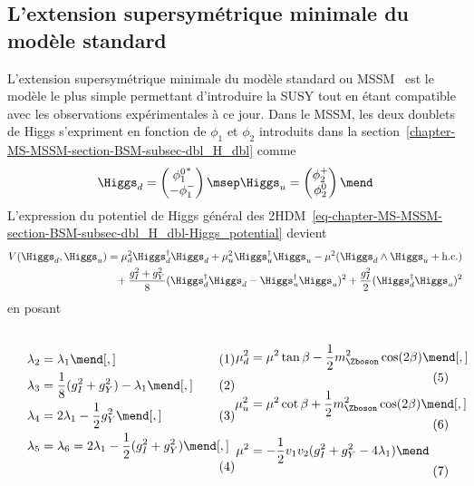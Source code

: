 \subsection{L'extension supersymétrique minimale du modèle standard}\label{chapter-MS-MSSM-section-BSM-subsec-MSSM}
L'extension supersymétrique minimale du modèle standard ou MSSM~\cite{mssm_fayet1,mssm_fayet2}
est le modèle le plus simple permettant d'introduire la SUSY tout en étant compatible avec les observations expérimentales à ce jour.
Dans le MSSM, les deux doublets de Higgs s'expriment en fonction de $\phi_1$ et $\phi_2$ introduits dans la section~\ref{chapter-MS-MSSM-section-BSM-subsec-dbl_H_dbl} comme~\cite{Higgs_hunter_guide}
\begin{equation}
\Higgs_d
=
\begin{pmatrix}
{\phi_1^0}^* \\ -\phi_1^-
\end{pmatrix}
\msep
\Higgs_u
=
\begin{pmatrix}
\phi_2^+ \\ \phi_2^0
\end{pmatrix}
\mend
\label{eq-chapter-MS-MSSM-section-BSM-Higgs_doublets}
\end{equation}
L'expression du potentiel de Higgs général des 2HDM~\eqref{eq-chapter-MS-MSSM-section-BSM-subsec-dbl_H_dbl-Higgs_potential} devient
\begin{align}
V(\Higgs_d,\Higgs_u)
&
=
\mu_d^2\Higgs_d^\dagger\Higgs_d
+
\mu_u^2\Higgs_u^\dagger\Higgs_u
-
\mu^2 (\Higgs_d\wedge\Higgs_u+\text{h.c.})
\nonumber\\
&\hphantom{=}
+
\frac{g_I^2+g_Y^2}{8} (\Higgs_d^\dagger\Higgs_d-\Higgs_u^\dagger\Higgs_u)^2
+
\frac{g_I^2}{2} (\Higgs_d^\dagger\Higgs_u)^2
\end{align}
en posant~\cite{Higgs_hunter_guide,Higgs_hunter_guide_errata,Nagashima_BSM}
\vspace{-.5\baselineskip}\par\noindent
\begin{subequations}
\noindent
\begin{minipage}[c]{.49\textwidth}
\begin{align}
\lambda_2 &= \lambda_1 \mend[,]\\
\lambda_3 &= \frac{1}{8} (g_I^2+g_Y^2)-\lambda_1 \mend[,]\\
\lambda_4 &= 2\lambda_1 - \frac{1}{2} g_Y^2 \mend[,]\\
\lambda_5 &= \lambda_6 = 2\lambda_1 - \frac{1}{2}(g_I^2+g_Y^2) \mend[,]
\end{align}
\end{minipage}
\hfill
\begin{minipage}[c]{.49\textwidth}
\begin{align}
\mu_d^2 &= \mu^2\tan\beta - \frac{1}{2} m_{\Zboson}^2 \cos(2\beta) \mend[,]\\
\mu_u^2 &= \mu^2\cot\beta + \frac{1}{2} m_{\Zboson}^2 \cos(2\beta) \mend[,]\\
\mu^2 &= -\frac{1}{2}v_1v_2(g_I^2+g_Y^2-4\lambda_1)
\mend
\end{align}
\end{minipage}
\end{subequations}
